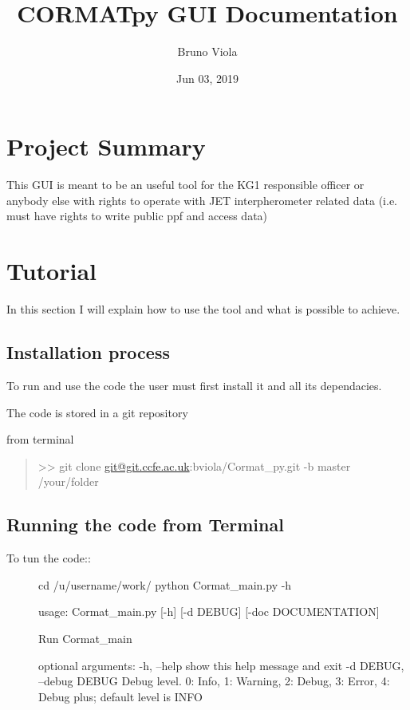 \documentclass[letterpaper,10pt,english]{sphinxmanual}
\title{CORMATpy  GUI Documentation}
\date{Jun 03, 2019}
\author{Bruno Viola}
\begin{document}
\maketitle
\tableofcontents
{}\label{index::doc}



\chapter{Project Summary}
\label{project:cormatpy-gui-documentation}\label{project:project-summary}\label{project::doc}
This GUI is meant to be an useful tool for the KG1 responsible officer or
anybody else with rights to operate with JET interpherometer related data (i.e.
must have rights to write public ppf and access data)


\chapter{Tutorial}
\label{tutorial:tutorial}\label{tutorial::doc}
In this section I will explain how to use the tool and what is possible to
achieve.


\section{Installation process}
\label{tutorial:installation-process}
To run and use the code the user must first install it and all its dependacies.

The code is stored in a git repository

from terminal
\begin{quote}

\textgreater{}\textgreater{} git clone \href{mailto:git@git.ccfe.ac.uk}{git@git.ccfe.ac.uk}:bviola/Cormat\_py.git -b master /your/folder
\end{quote}


\section{Running the code from Terminal}
\label{tutorial:running-the-code-from-terminal}\begin{description}
\item[{To tun the code::}] \leavevmode
cd /u/username/work/
python Cormat\_main.py -h

usage: Cormat\_main.py {[}-h{]} {[}-d DEBUG{]} {[}-doc DOCUMENTATION{]}

Run Cormat\_main

optional arguments:
-h, --help            show this help message and exit
-d DEBUG, --debug DEBUG
Debug level. 0: Info, 1: Warning, 2: Debug, 3: Error, 4: Debug plus;
default level is INFO

\end{description}
\end{document}
